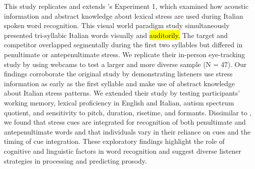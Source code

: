 This study replicates and extends \cite{Sulpizio_McQueen_2012}'s Experiment 1, which examined how acoustic information and abstract knowledge about lexical stress are used during Italian spoken word recognition. This visual world paradigm study simultaneously presented tri-syllabic Italian words visually and \hl{auditorily.} The target and competitor overlapped segmentally during the first two syllables but differed in penultimate or antepenultimate stress. We replicate their in-person eye-tracking study by using webcams to test a larger and more diverse sample (N = 47). Our findings corroborate the original study by demonstrating listeners use stress information as early as the first syllable and make use of abstract knowledge about Italian stress patterns. We extended their study by testing participants' working memory, lexical proficiency in English and Italian, autism spectrum quotient, and sensitivity to pitch, duration, risetime, and formants. Dissimilar to \cite{Sulpizio_McQueen_2012}, we found that stress cues are integrated for recognition of both penultimate and antepenultimate words and that individuals vary in their reliance on cues and the timing of cue integration. These exploratory findings highlight the role of cognitive and linguistic factors in word recognition and suggest diverse listener strategies in processing and predicting prosody. 